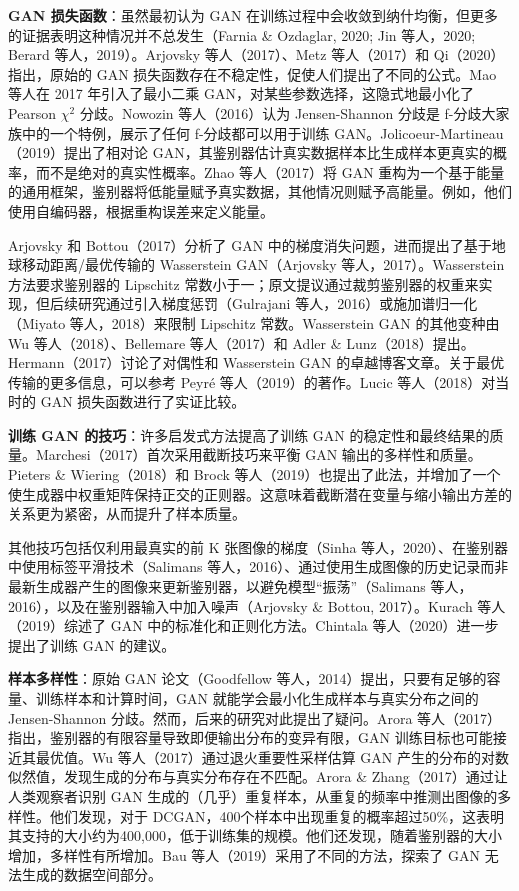 \textbf{GAN 损失函数}：虽然最初认为 GAN 在训练过程中会收敛到纳什均衡，但更多的证据表明这种情况并不总发生（Farnia \& Ozdaglar, 2020; Jin 等人，2020; Berard 等人，2019）。Arjovsky 等人（2017）、Metz 等人（2017）和 Qi（2020）指出，原始的 GAN 损失函数存在不稳定性，促使人们提出了不同的公式。Mao 等人在 2017 年引入了最小二乘 GAN，对某些参数选择，这隐式地最小化了 Pearson \(\chi^2\) 分歧。Nowozin 等人（2016）认为 Jensen-Shannon 分歧是 f-分歧大家族中的一个特例，展示了任何 f-分歧都可以用于训练 GAN。Jolicoeur-Martineau（2019）提出了相对论 GAN，其鉴别器估计真实数据样本比生成样本更真实的概率，而不是绝对的真实性概率。Zhao 等人（2017）将 GAN 重构为一个基于能量的通用框架，鉴别器将低能量赋予真实数据，其他情况则赋予高能量。例如，他们使用自编码器，根据重构误差来定义能量。

Arjovsky 和 Bottou（2017）分析了 GAN 中的梯度消失问题，进而提出了基于地球移动距离/最优传输的 Wasserstein GAN（Arjovsky 等人，2017）。Wasserstein 方法要求鉴别器的 Lipschitz 常数小于一；原文提议通过裁剪鉴别器的权重来实现，但后续研究通过引入梯度惩罚（Gulrajani 等人，2016）或施加谱归一化（Miyato 等人，2018）来限制 Lipschitz 常数。Wasserstein GAN 的其他变种由 Wu 等人（2018）、Bellemare 等人（2017）和 Adler \& Lunz（2018）提出。Hermann（2017）讨论了对偶性和 Wasserstein GAN 的卓越博客文章。关于最优传输的更多信息，可以参考 Peyré 等人（2019）的著作。Lucic 等人（2018）对当时的 GAN 损失函数进行了实证比较。

\textbf{训练 GAN 的技巧}：许多启发式方法提高了训练 GAN 的稳定性和最终结果的质量。Marchesi（2017）首次采用截断技巧来平衡 GAN 输出的多样性和质量。Pieters \& Wiering（2018）和 Brock 等人（2019）也提出了此法，并增加了一个使生成器中权重矩阵保持正交的正则器。这意味着截断潜在变量与缩小输出方差的关系更为紧密，从而提升了样本质量。

其他技巧包括仅利用最真实的前 K 张图像的梯度（Sinha 等人，2020）、在鉴别器中使用标签平滑技术（Salimans 等人，2016）、通过使用生成图像的历史记录而非最新生成器产生的图像来更新鉴别器，以避免模型“振荡”（Salimans 等人，2016），以及在鉴别器输入中加入噪声（Arjovsky \& Bottou, 2017）。Kurach 等人（2019）综述了 GAN 中的标准化和正则化方法。Chintala 等人（2020）进一步提出了训练 GAN 的建议。

\textbf{样本多样性}：原始 GAN 论文（Goodfellow 等人，2014）提出，只要有足够的容量、训练样本和计算时间，GAN 就能学会最小化生成样本与真实分布之间的 Jensen-Shannon 分歧。然而，后来的研究对此提出了疑问。Arora 等人（2017）指出，鉴别器的有限容量导致即便输出分布的变异有限，GAN 训练目标也可能接近其最优值。Wu 等人（2017）通过退火重要性采样估算 GAN 产生的分布的对数似然值，发现生成的分布与真实分布存在不匹配。Arora \& Zhang（2017）通过让人类观察者识别 GAN 生成的（几乎）重复样本，从重复的频率中推测出图像的多样性。他们发现，对于 DCGAN，400个样本中出现重复的概率超过50\%，这表明其支持的大小约为400,000，低于训练集的规模。他们还发现，随着鉴别器的大小增加，多样性有所增加。Bau 等人（2019）采用了不同的方法，探索了 GAN 无法生成的数据空间部分。

